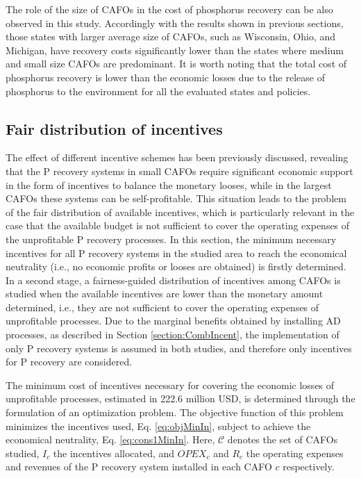 \begin{refsection}[referencesCh5]
The role of the size of CAFOs in the cost of phosphorus recovery can be also observed in this study. Accordingly with the results shown in previous sections, those states with larger average size of CAFOs, such as Wisconsin, Ohio, and Michigan, have recovery costs significantly lower than the states where medium and small size CAFOs are predominant. It is worth noting that the total cost of phosphorus recovery is lower than the economic losses due to the release of phosphorus to the environment for all the evaluated states and policies.

\subsection{Fair distribution of incentives}
The effect of different incentive schemes has been previously discussed, revealing that the P recovery systems in small CAFOs require significant economic support in the form of incentives to balance the monetary looses, while in the largest CAFOs these systems can be self-profitable. This situation leads to the problem of the fair distribution of available incentives, which is particularly relevant in the case that the available budget is not sufficient to cover the operating expenses of the unprofitable P recovery processes. In this section, the minimum necessary incentives for all P recovery systems in the studied area to reach the economical neutrality (i.e., no economic profits or looses are obtained) is firstly determined. In a second stage, a fairness-guided distribution of incentives among CAFOs is studied when the available incentives are lower than the monetary amount determined, i.e., they are not sufficient to cover the operating expenses of unprofitable processes. Due to the marginal benefits obtained by installing AD processes, as described in Section \ref{section:CombIncent}, the implementation of only P recovery systems is assumed in both studies, and therefore only incentives for P recovery are considered.

The minimum cost of incentives necessary for covering the economic losses of unprofitable processes, estimated in 222.6 million USD, is determined through the formulation of an optimization problem. The objective function of this problem minimizes the incentives used, Eq. \ref{eq:objMinIn}, subject to achieve the economical neutrality, Eq. \ref{eq:cons1MinIn}. Here, $\mathcal{C}$ denotes the set of CAFOs studied, $I_{c}$ the  incentives allocated, and $OPEX_{c}$ and $R_{c}$ the operating expenses and revenues of the P recovery system installed in each CAFO $c$ respectively.


\end{refsection}
